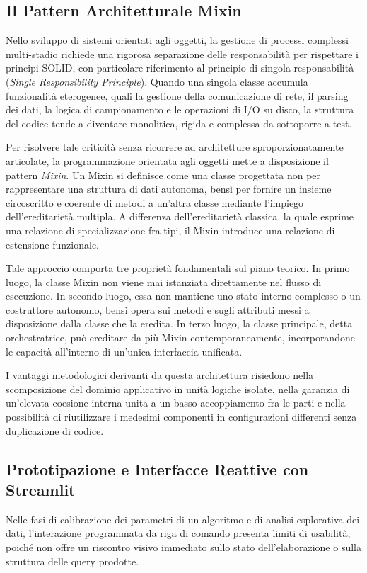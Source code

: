 \documentclass[12pt,a4paper,openright,twoside]{book}
\begin{document}
\subsection{Il Pattern Architetturale Mixin}
Nello sviluppo di sistemi orientati agli oggetti, la gestione di processi
complessi multi-stadio richiede una rigorosa separazione delle responsabilità
per rispettare i principi SOLID, con particolare riferimento al principio di
singola responsabilità (\textit{Single Responsibility Principle}). Quando una
singola classe accumula funzionalità eterogenee, quali la gestione della
comunicazione di rete, il parsing dei dati, la logica di campionamento e le
operazioni di I/O su disco, la struttura del codice tende a diventare
monolitica, rigida e complessa da sottoporre a test.

Per risolvere tale criticità senza ricorrere ad architetture sproporzionatamente
articolate, la programmazione orientata agli oggetti mette a disposizione il
pattern \textit{Mixin}. Un Mixin si definisce come una classe progettata non per
rappresentare una struttura di dati autonoma, bensì per fornire un insieme
circoscritto e coerente di metodi a un'altra classe mediante l'impiego
dell'ereditarietà multipla. A differenza dell'ereditarietà classica, la quale
esprime una relazione di specializzazione fra tipi, il Mixin introduce una
relazione di estensione funzionale.

Tale approccio comporta tre proprietà fondamentali sul piano teorico. In primo
luogo, la classe Mixin non viene mai istanziata direttamente nel flusso di
esecuzione. In secondo luogo, essa non mantiene uno stato interno complesso o un
costruttore autonomo, bensì opera sui metodi e sugli attributi messi a
disposizione dalla classe che la eredita. In terzo luogo, la classe principale,
detta orchestratrice, può ereditare da più Mixin contemporaneamente,
incorporandone le capacità all'interno di un'unica interfaccia unificata.

I vantaggi metodologici derivanti da questa architettura risiedono nella
scomposizione del dominio applicativo in unità logiche isolate, nella garanzia
di un'elevata coesione interna unita a un basso accoppiamento fra le parti e
nella possibilità di riutilizzare i medesimi componenti in configurazioni
differenti senza duplicazione di codice.

\subsection{Prototipazione e Interfacce Reattive con Streamlit}
Nelle fasi di calibrazione dei parametri di un algoritmo e di analisi
esplorativa dei dati, l'interazione programmata da riga di comando presenta
limiti di usabilità, poiché non offre un riscontro visivo immediato sullo stato
dell'elaborazione o sulla struttura delle query prodotte.
\end{document}
